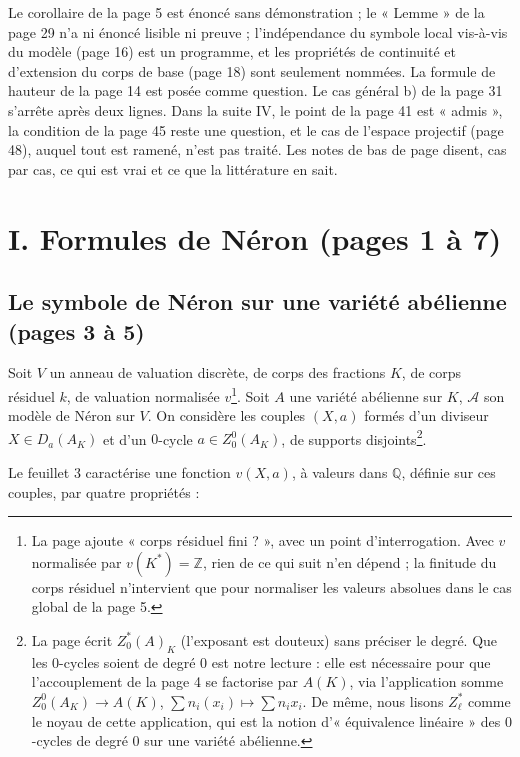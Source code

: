 \documentclass[11pt,a4paper]{article}
\begin{document}
Le corollaire de la page 5 est énoncé sans démonstration ; le « Lemme » de
la page 29 n'a ni énoncé lisible ni preuve ; l'indépendance du symbole
local vis-à-vis du modèle (page 16) est un programme, et les propriétés
de continuité et d'extension du corps de base (page 18) sont seulement
nommées. La formule de hauteur de la page 14 est posée comme question. Le
cas général b) de la page 31 s'arrête après deux lignes. Dans la suite IV,
le point de la page 41 est « admis », la condition de la page 45 reste une
question, et le cas de l'espace projectif (page 48), auquel tout est
ramené, n'est pas traité. Les notes de bas de page disent, cas par cas, ce
qui est vrai et ce que la littérature en sait.

\section*{I. Formules de Néron (pages 1 à 7)}

\subsection*{Le symbole de Néron sur une variété abélienne (pages 3 à 5)}

Soit $V$ un anneau de valuation discrète, de corps des fractions $K$, de
corps résiduel $k$, de valuation normalisée $v$\footnote{La page ajoute
« corps résiduel fini ? », avec un point d'interrogation. Avec $v$
normalisée par $v(K^*) = \mathbb{Z}$, rien de ce qui suit n'en dépend ; la
finitude du corps résiduel n'intervient que pour normaliser les valeurs
absolues dans le cas global de la page 5.}. Soit $A$ une variété abélienne
sur $K$, $\mathcal{A}$ son modèle de Néron sur $V$. On considère les couples
$(X, a)$ formés d'un diviseur $X \in D_a(A_K)$ et d'un $0$-cycle
$a \in Z_0^0(A_K)$, de supports disjoints\footnote{La page écrit
$Z_0^{*}(A)_K$ (l'exposant est douteux) sans préciser le degré. Que les
$0$-cycles soient de degré $0$ est notre lecture : elle est nécessaire pour
que l'accouplement de la page 4 se factorise par $A(K)$, via l'application
somme $Z_0^0(A_K) \to A(K)$, $\sum n_i (x_i) \mapsto \sum n_i x_i$. De même,
nous lisons $Z_\ell^{*}$ comme le noyau de cette application, qui est la
notion d'« équivalence linéaire » des $0$-cycles de degré $0$ sur une
variété abélienne.}.

Le feuillet 3 caractérise une fonction $v(X, a)$, à valeurs dans
$\mathbb{Q}$, définie sur ces couples, par quatre propriétés :
\end{document}
